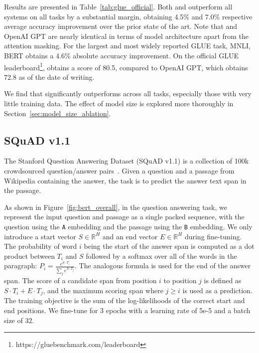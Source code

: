 Results are presented in Table~\ref{tab:glue_official}. Both \bertbase and \bertlarge outperform all systems on all tasks by a substantial margin, obtaining 4.5\% and 7.0\% respective average accuracy improvement over the prior state of the art. Note that \bertbase and OpenAI GPT are nearly identical in terms of model architecture apart from the attention masking. For the largest and most widely reported GLUE task, MNLI, BERT obtains a 4.6\% absolute accuracy improvement. On the official GLUE leaderboard\footnote{https://gluebenchmark.com/leaderboard},
\bertlarge obtains a score of 80.5, compared to OpenAI GPT, which obtains 72.8 as of the date of writing.

We find that \bertlarge significantly outperforms \bertbase across all tasks, especially those with very little training data. The effect of model size is explored more thoroughly in Section~\ref{sec:model_size_ablation}.

\subsection{SQuAD v1.1}
\label{sec:squad}

The Stanford Question Answering Dataset (SQuAD v1.1) is a collection of 100k crowdsourced question/answer pairs~\cite{rajpurkar-etal:2016:_squad}. Given a question and a passage from Wikipedia containing the answer, the task is to predict the answer text span in the passage. 


As shown in Figure~\ref{fig:bert_overall}, in the question answering task,
we represent the input question and passage as a single packed sequence, with the question using the {\tt A} embedding and the passage using the {\tt B} embedding. We only introduce a start vector $S \in \mathbb{R}^H$ and an end vector $E \in \mathbb{R}^H$ during fine-tuning.
The probability of word $i$ being the start of the answer span is computed as a dot product between $T_i$ and $S$ followed by a softmax over all of the words in the paragraph: $P_i = \frac{e^{S{\cdot}T_i}}{\sum_j e^{S{\cdot}T_j}}$. The analogous formula is used for the end of the answer span. The score of a candidate span from position $i$ to position $j$ is defined as  $S{\cdot}T_i + E{\cdot}T_j$, and the maximum scoring span where $j \geq i$ is used as a prediction. The training objective is the sum of the log-likelihoods of the correct start and end positions. We fine-tune for 3 epochs with a learning rate of 5e-5 and a batch size of 32. 

